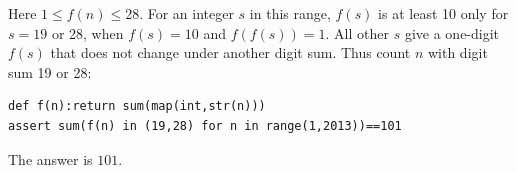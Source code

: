 Here $ 1\le f(n)\le28 $. For an integer $ s $ in this range, $ f(s)$ is at least 10 only for $ s=19 $ or 28, when $ f(s)=10 $ and $ f(f(s))=1 $. All other $ s $ give a one-digit $ f(s)$ that does not change under another digit sum. Thus count $ n $ with digit sum 19 or 28:
\begin{verbatim}
def f(n):return sum(map(int,str(n)))
assert sum(f(n) in (19,28) for n in range(1,2013))==101
\end{verbatim}
The answer is $\boxed{101}$.
